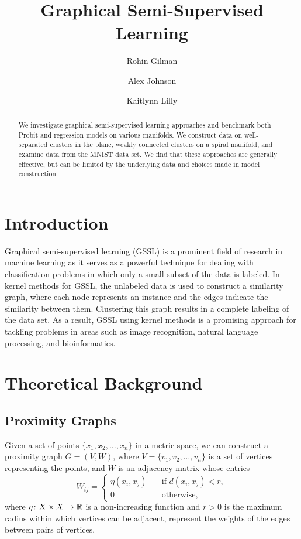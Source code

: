 \documentclass[12pt]{amsart}
\title{Graphical Semi-Supervised Learning}
\author{Rohin Gilman \and Alex Johnson \and Kaitlynn Lilly}
\begin{document}
\begin{abstract}
    We investigate graphical semi-supervised learning approaches and benchmark both Probit and regression models on various manifolds. We construct data on well-separated clusters in the plane, weakly connected clusters on a spiral manifold, and examine data from the MNIST data set. We find that these approaches are generally effective, but can be limited by the underlying data and choices made in model construction.
\end{abstract}

\maketitle

\section{Introduction} 
Graphical semi-supervised learning (GSSL) is a prominent field of research in machine learning as it serves as a powerful technique for dealing with classification problems in which only a small subset of the data is labeled. In kernel methods for GSSL, the unlabeled data is used to construct a similarity graph, where each node represents an instance and the edges indicate the similarity between them. Clustering this graph results in a complete labeling of the data set. As a result, GSSL using kernel methods is a promising approach for tackling problems in areas such as image recognition, natural language processing, and bioinformatics.

\section{Theoretical Background}

\subsection{Proximity Graphs}
Given a set of points $\{x_1, x_2, \dots, x_n\}$ in a metric space, we can construct a proximity graph $G = (V, W)$, where $V = \{v_1, v_2, \dots, v_n\}$ is a set of vertices representing the points, and $W$ is an adjacency matrix whose entries 
\[W_{ij} = \begin{cases}
  \eta(x_i,x_j) \quad&\text{if } d(x_i,x_j) < r, \\
  0 \quad&\text{otherwise},
\end{cases}\]
where $\eta\colon X\times X \to \mathbb{R}$ is a non-increasing function and $r > 0$ is the maximum radius within which vertices can be adjacent, represent the weights of the edges between pairs of vertices.
\end{document}
